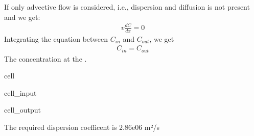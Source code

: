 \documentclass[letterpaper,10pt,english]{jupyterBook}
\begin{document}
\sphinxAtStartPar
If only advective flow is considered, i.e., dispersion and diffusion is not present and we get:
\begin{equation*}
\begin{split}
v\frac{dC}{dx} = 0 
\end{split}
\end{equation*}
\sphinxAtStartPar
Integrating the equation between \(C_{in}\) and \(C_{out}\), we get
\begin{equation*}
\begin{split}
C_{in} = C_{out}
\end{split}
\end{equation*}
\sphinxAtStartPar
The concentration at the .

\begin{sphinxuseclass}{cell}\begin{sphinxVerbatimInput}

\begin{sphinxuseclass}{cell_input}
\begin{sphinxVerbatim}[commandchars=\\\{\}]


   

   
 
\end{sphinxVerbatim}

\end{sphinxuseclass}\end{sphinxVerbatimInput}
\begin{sphinxVerbatimOutput}

\begin{sphinxuseclass}{cell_output}
\begin{sphinxVerbatim}[commandchars=\\\{\}]
 The required dispersion coefficent is 2.86e\PYGZhy{}06 m²/s
\end{sphinxVerbatim}

\end{sphinxuseclass}\end{sphinxVerbatimOutput}

\end{sphinxuseclass}
\end{document}
